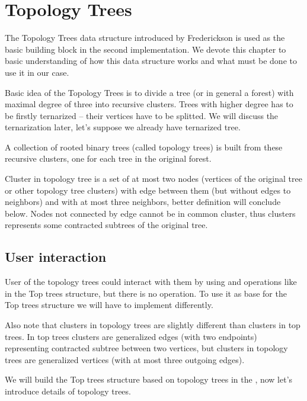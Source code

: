 \chapter{Topology Trees}
\label{chap:TopologyTrees}

The Topology Trees data structure introduced by Frederickson
\cite{DSforDynamicallyMaintainingRootedTrees} is used as the basic building
block in the second implementation. We devote this chapter to basic
understanding of how this data structure works and what must be done to use
it in our case.

Basic idea of the Topology Trees is to divide a tree (or in general a forest)
with maximal degree of three into recursive {\I clusters}. Trees with higher
degree has to be firstly {\I ternarized} -- their vertices have to be splitted.
We will discuss the ternarization later, let's suppose we already have
ternarized tree.

A collection of rooted binary trees (called {\I topology trees}) is built from
these recursive clusters, one for each tree in the original forest.

Cluster in topology tree is a set of at most two nodes (vertices of the
original tree or other topology tree clusters) with edge between them (but
without edges to neighbors) and with at most three neighbors, better
definition will conclude below. Nodes not connected by edge cannot be in common
cluster, thus clusters represents some contracted subtrees of the original tree.

\section{User interaction}

User of the topology trees could interact with them by using \Cut{} and \Link{}
operations like in the Top trees structure, but there is no \Expose{} operation.
To use it as base for the Top trees structure we will have to implement
\Expose{} differently.

Also note that clusters in topology trees are slightly different than clusters
in top trees. In top trees clusters are generalized edges (with two endpoints)
representing contracted subtree between two vertices, but clusters in topology
trees are generalized vertices (with at most three outgoing edges).

We will build the Top trees structure based on topology trees in
the , now let's introduce details of topology
trees.

